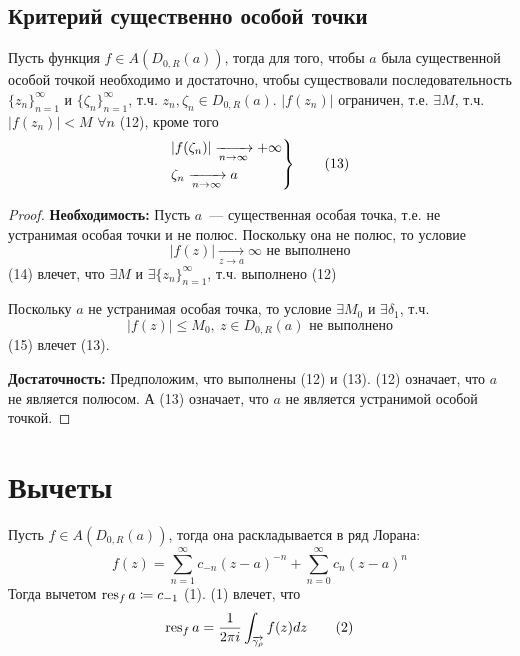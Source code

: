 \documentclass[main]{subfiles}
\begin{document}
\subsection{Критерий существенно особой точки}
\begin{theorem}
    Пусть функция $f \in A(D_{0, R}(a))$, тогда для того, чтобы $a$ была существенной особой точкой необходимо и достаточно, чтобы существовали последовательность $\{z_n\}_{n=1}^\infty$ и $\{\zeta_n\}_{n=1}^\infty$, т.ч. $z_n, \zeta_n \in D_{0,R}(a)$.
    $|f(z_n)|$ ограничен, т.е. $\exists M$, т.ч. $|f(z_n)| < M$ $\forall n$ (12), кроме того
    \begin{gather*}
        \begin{rcases}
            |f(\zeta_n)| \xrightarrow[n \to \infty]{} +\infty \\
            \zeta_n \xrightarrow[n \to \infty]{} a
        \end{rcases}\tag{13}
    \end{gather*}
\end{theorem}
\begin{proof}
    \textbf{Необходимость:}
    Пусть $a$~--- существенная особая точка, т.е. не устранимая особая точки и не полюс.
    Поскольку она не полюс, то условие
    \[|f(z)| \xrightarrow[z \to a]{} \infty \text{ не выполнено} \tag{14}\]
    (14) влечет, что $\exists M$ и $\exists \{z_n\}_{n=1}^\infty$, т.ч. выполнено (12)

    Поскольку $a$ не устранимая особая точка, то условие $\exists M_0$ и $\exists \delta_1$, т.ч.
    \[|f(z)| \le M_0,\ z \in D_{0, R} (a) \text{ не выполнено} \tag{15}\]
    (15) влечет (13).

    \textbf{Достаточность:}
    Предположим, что выполнены (12) и (13).
    (12) означает, что $a$ не является полюсом.
    А (13) означает, что $a$ не является устранимой особой точкой.
\end{proof}

\section{Вычеты}
\begin{definition}
    Пусть $f \in A(D_{0, R}(a))$, тогда она раскладывается в ряд Лорана:
    \[f(z) = \sum_{n=1}^{\infty} c_{-n} (z-a)^{-n} + \sum_{n=0}^{\infty} c_{n} (z-a)^n \tag{1}\]
    Тогда вычетом $\operatorname{res}_f a \coloneq c_{-1}$ (1).
    (1) влечет, что
    \[\operatorname{res}_f a = \frac{1}{2 \pi i} \int_{\overrightarrow{\gamma_\rho}} f(z) dz \tag{2}\]
\end{definition}
\end{document}
